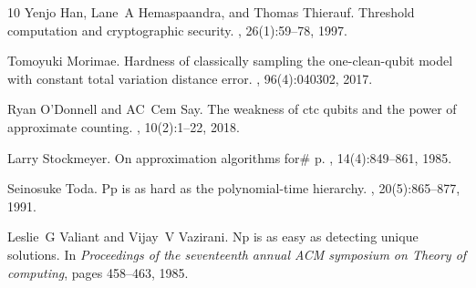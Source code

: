 \documentclass[10pt,a4paper]{article}
\begin{document}
\begin{thebibliography}{10}
Yenjo Han, Lane~A Hemaspaandra, and Thomas Thierauf.
\newblock Threshold computation and cryptographic security.
, 26(1):59--78, 1997.

Tomoyuki Morimae.
\newblock Hardness of classically sampling the one-clean-qubit model with constant total variation distance error.
, 96(4):040302, 2017.

Ryan O'Donnell and AC~Cem Say.
\newblock The weakness of ctc qubits and the power of approximate counting.
, 10(2):1--22, 2018.

Larry Stockmeyer.
\newblock On approximation algorithms for\# p.
, 14(4):849--861, 1985.

Seinosuke Toda.
\newblock Pp is as hard as the polynomial-time hierarchy.
, 20(5):865--877, 1991.

Leslie~G Valiant and Vijay~V Vazirani.
\newblock Np is as easy as detecting unique solutions.
\newblock In {\em Proceedings of the seventeenth annual ACM symposium on Theory of computing}, pages 458--463, 1985.

\end{thebibliography}
\end{document}
